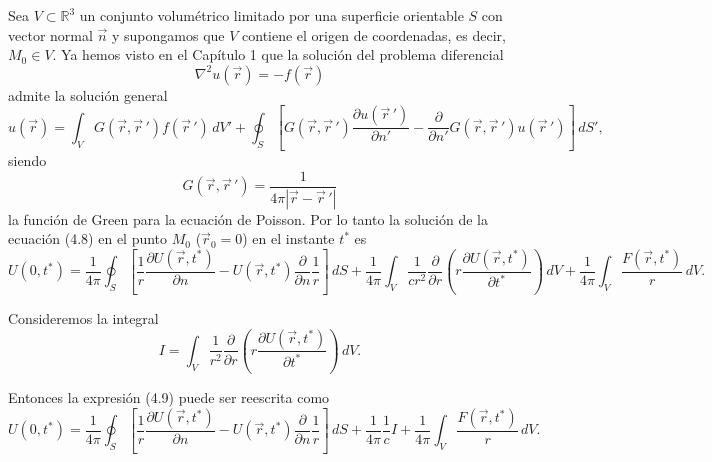 \documentclass[12pt,a4paper]{book}
\begin{document}
Sea $V \subset \mathbb{R}^3$ un conjunto volumétrico limitado por una superficie orientable $S$ con vector normal $\vec{n}$ y supongamos que $V$ contiene el origen de coordenadas, es decir, $M_0 \in V$. Ya hemos visto en el Capítulo 1 que la solución del problema diferencial
\begin{equation}
\nabla^2 u(\vec{r}) = -f(\vec{r})
\end{equation}
admite la solución general
\begin{equation}
u(\vec{r}) = \int_V G(\vec{r},\vec{r}\,')f(\vec{r}\,')\,dV' + \oint_S \left[G(\vec{r},\vec{r}\,')\frac{\partial u(\vec{r}\,')}{\partial n'} - \frac{\partial}{\partial n'}G(\vec{r},\vec{r}\,')u(\vec{r}\,')\right]\,dS',
\end{equation}
siendo
\begin{equation}
G(\vec{r},\vec{r}\,') = \frac{1}{4\pi|\vec{r} - \vec{r}\,'|}
\end{equation}
la función de Green para la ecuación de Poisson. Por lo tanto la solución de la ecuación (4.8) en el punto $M_0$ ($\vec{r}_0 = 0$) en el instante $t^*$ es
\begin{equation}
U(0, t^*) = \frac{1}{4\pi}\oint_S \left[\frac{1}{r}\frac{\partial U(\vec{r}, t^*)}{\partial n} - U(\vec{r}, t^*)\frac{\partial}{\partial n}\frac{1}{r}\right]\,dS + \frac{1}{4\pi}\int_V \frac{1}{cr^2}\frac{\partial}{\partial r}\left(r\frac{\partial U(\vec{r}, t^*)}{\partial t^*}\right)\,dV + \frac{1}{4\pi}\int_V \frac{F(\vec{r}, t^*)}{r}\,dV.
\end{equation}

Consideremos la integral
\begin{equation}
I = \int_V \frac{1}{r^2}\frac{\partial}{\partial r}\left(r\frac{\partial U(\vec{r}, t^*)}{\partial t^*}\right)\,dV.
\end{equation}

Entonces la expresión (4.9) puede ser reescrita como
\begin{equation}
U(0, t^*) = \frac{1}{4\pi}\oint_S \left[\frac{1}{r}\frac{\partial U(\vec{r}, t^*)}{\partial n} - U(\vec{r}, t^*)\frac{\partial}{\partial n}\frac{1}{r}\right]\,dS + \frac{1}{4\pi}\frac{1}{c}I + \frac{1}{4\pi}\int_V \frac{F(\vec{r}, t^*)}{r}\,dV.
\end{equation}
\end{document}
